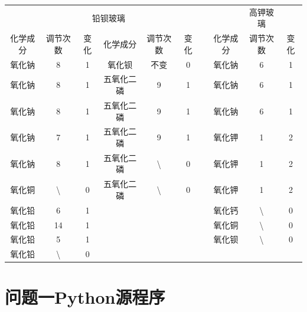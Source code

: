 \documentclass[withoutpreface,bwprint]{cumcmthesis} %
\begin{document}
\begin{appendices}
\begin{table}[H]
  \begin{tabular}{cccccccccc}
    \toprule[1.5pt]
    &                  & \multicolumn{2}{c}{铅钡玻璃} &                  &      &  &      & 高钾玻璃             &      \\ \cline{1-6} \cline{8-10} 
    化学成分 & 调节次数             & 变化       & 化学成分        & 调节次数             & 变化 &  & 化学成分 & 调节次数             & 变化 \\ \hline
    氧化钠  & 8                & 1          & 氧化钡         & 不变               & 0    &  & 氧化钠  & 6                & 1    \\
    氧化钠  & 8                & 1          & 五氧化二磷       & 9                & 1    &  & 氧化钠  & 6                & 1    \\
    氧化钠  & 8                & 1          & 五氧化二磷       & 9                & 1    &  & 氧化钠  & 6                & 1    \\
    氧化钠  & 7                & 1          & 五氧化二磷       & 9                & 1    &  & 氧化钾  & 1                & 2    \\
    氧化钠  & 8                & 1          & 五氧化二磷       & \textbackslash{} & 0    &  & 氧化钾  & 1                & 2    \\
    氧化铜  & \textbackslash{} & 0          & 五氧化二磷       & \textbackslash{} & 0    &  & 氧化钾  & 1                & 2    \\
    氧化铅  & 6                & 1          &             &                  &      &  & 氧化钙  & \textbackslash{} & 0    \\
    氧化铅  & 14               & 1          &             &                  &      &  & 氧化铜  & \textbackslash{} & 0    \\
    氧化铅  & 5                & 1          &             &                  &      &  & 氧化钡  & \textbackslash{} & 0    \\
    氧化铅  & \textbackslash{} & 0          &             &                  &      &  &      &                  &      \\ \bottomrule[1.5pt]
  \end{tabular}
\end{table}

\newpage
\section{问题一Python源程序}


\end{appendices}
\end{document}
